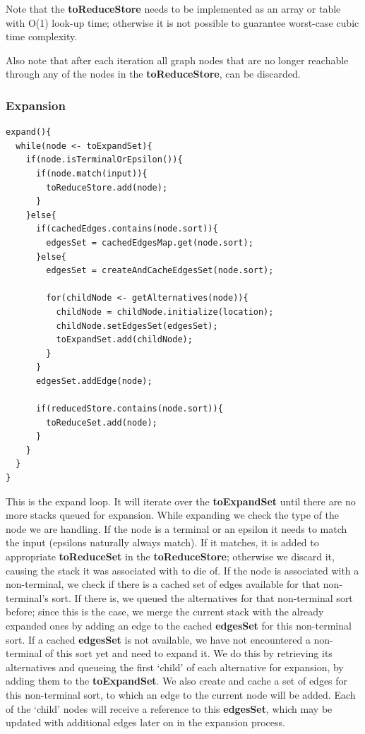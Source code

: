 \documentclass[a4paper,10pt]{article}
\begin{document}
Note that the {\bf toReduceStore} needs to be implemented as an array or table with O(1) look-up time; otherwise it is not possible to guarantee worst-case cubic time complexity.

Also note that after each iteration all graph nodes that are no longer reachable through any of the nodes in the {\bf toReduceStore}, can be discarded.

\pagebreak
\subsubsection{Expansion}
\label{subsec:pseudocodeExpand}
{\small
\begin{verbatim}
expand(){
  while(node <- toExpandSet){
    if(node.isTerminalOrEpsilon()){
      if(node.match(input)){
        toReduceStore.add(node);
      }
    }else{
      if(cachedEdges.contains(node.sort)){
        edgesSet = cachedEdgesMap.get(node.sort);
      }else{
        edgesSet = createAndCacheEdgesSet(node.sort);
        
        for(childNode <- getAlternatives(node)){
          childNode = childNode.initialize(location);
          childNode.setEdgesSet(edgesSet);
          toExpandSet.add(childNode);
        }
      }
      edgesSet.addEdge(node);
      
      if(reducedStore.contains(node.sort)){
        toReduceSet.add(node);
      }
    }
  }
}
\end{verbatim}
}

This is the expand loop. It will iterate over the {\bf toExpandSet} until there are no more stacks queued for expansion. While expanding we check the type of the node we are handling. If the node is a terminal or an epsilon it needs to match the input (epsilons naturally always match). If it matches, it is added to appropriate {\bf toReduceSet} in the {\bf toReduceStore}; otherwise we discard it, causing the stack it was associated with to die of. If the node is associated with a non-terminal, we check if there is a cached set of edges available for that non-terminal's sort. If there is, we queued the alternatives for that non-terminal sort before; since this is the case, we merge the current stack with the already expanded ones by adding an edge to the cached {\bf edgesSet} for this non-terminal sort. If a cached {\bf edgesSet} is not available, we have not encountered a non-terminal of this sort yet and need to expand it. We do this by retrieving its alternatives and queueing the first `child' of each alternative for expansion, by adding them to the {\bf toExpandSet}. We also create and cache a set of edges for this non-terminal sort, to which an edge to the current node will be added. Each of the `child' nodes will receive a reference to this {\bf edgesSet}, which may be updated with additional edges later on in the expansion process.
\end{document}
